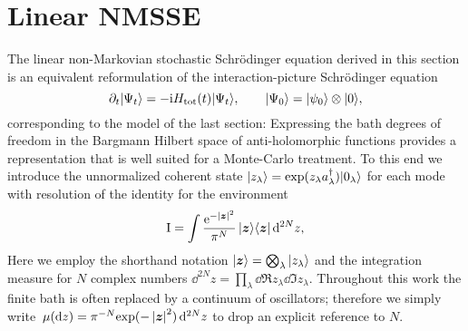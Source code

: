 

\section{Linear NMSSE}
\label{sec:nmqsd.lin_nmsse}
%
%

The linear non-Markovian stochastic Schrödinger equation derived in this section is an equivalent reformulation of the interaction-picture Schrödinger equation
\begin{equation}
  \partial_t | \Psi_t \rangle = -\mathrm{i} H_\mathrm{tot}(t) | \Psi_t \rangle, \qquad | \Psi_0 \rangle = | \psi_0 \rangle \otimes | 0 \rangle,
  \label{eq:nmqsd.schroedinger_ia}
\end{equation}
corresponding to the model of the last section:
Expressing the bath degrees of freedom in the Bargmann Hilbert space of anti-holomorphic functions\cite{Ba61_coherent_states} provides a representation that is well suited for a Monte-Carlo treatment.
To this end we introduce the unnormalized coherent state $\ket{z_\lambda} = \exp(z_\lambda \adj{a}_\lambda)\ket{0_\lambda}$ for each mode with resolution of the identity for the environment
\begin{equation}
  \unit = \int \frac{\exp[-\abs{\zz}^2]}{\pi^N} \, \ket{\zz}\bra{\zz} \dd^{2N}z,
  \label{eq:nmqsd.identity}
\end{equation}
Here we employ the shorthand notation $| \boldsymbol{z} \rangle = \bigotimes_\lambda | z_\lambda \rangle$ and the  integration measure for $N$ complex numbers $\dd^{2N}z = \prod_\lambda \dd\Re z_\lambda \dd\Im z_\lambda$.
Throughout this work the finite bath is often replaced by a continuum of oscillators; therefore we simply write $\mudz = \pi^{-N} \exp(-\abs{\vec z}^2) \dd^{2N}z$ to drop an explicit reference to $N$.

